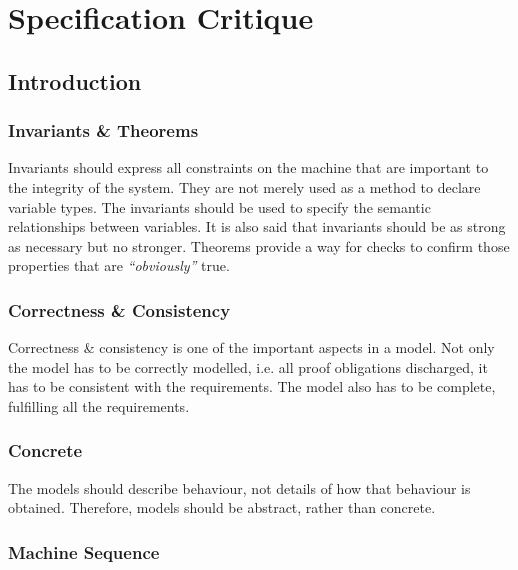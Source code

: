 
\def\mytitle{Specification Critique}
\def\myauthor{Group 03}
\def\email{se2020.grp03@cse.unsw.edu.au}
\def\mydate{05 August 2012}
\def\latexmode{memoir}

\chapter{Specification Critique}
\label{specificationcritique}

\section{Introduction}
\label{introduction}

\subsection{Invariants \& Theorems}
\label{invariantstheorems}

Invariants should express all constraints on the machine that are important to the integrity of the system. They are not merely used as a method to declare variable types. The invariants should be used to specify the semantic relationships between variables. It is also said that invariants should be as strong as necessary but no stronger. Theorems provide a way for checks to confirm those properties that are \emph{``obviously''} true.

\subsection{Correctness \& Consistency}
\label{correctnessconsistency}

Correctness \& consistency is one of the important aspects in a model. Not only the model has to be correctly modelled, i.e. all proof obligations discharged, it has to be consistent with the requirements. The model also has to be complete, fulfilling all the requirements.

\subsection{Concrete}
\label{concrete}

The models should describe behaviour, not details of how that behaviour is obtained. Therefore, models should be abstract, rather than concrete.

\subsection{Machine Sequence}
\label{machinesequence}

